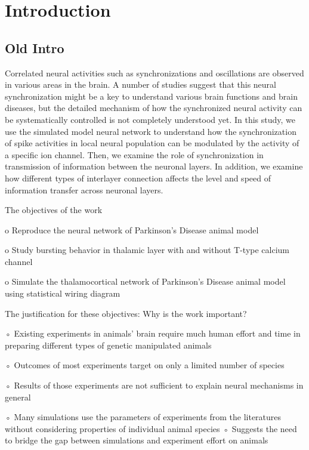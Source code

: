\chapter{Introduction}

\section{Old Intro}

Correlated neural activities such as synchronizations and oscillations are observed in various areas in the brain. A number of studies suggest that this neural synchronization might be a key to understand various brain functions and brain diseases, but the detailed mechanism of how the synchronized neural activity can be systematically controlled is not completely understood yet. 
In this study, we use the simulated model neural network to understand how the synchronization of spike activities in local neural population can be modulated by the activity of a specific ion channel. Then, we examine the role of synchronization in transmission of information between the neuronal layers. In addition, we examine how different types of interlayer connection affects the level and speed of information transfer across neuronal layers. 

The objectives of the work

o Reproduce the neural network of Parkinson’s Disease animal model

o Study bursting behavior in thalamic layer with and without T-type calcium channel

o Simulate the thalamocortical network of Parkinson’s Disease animal model using statistical wiring diagram


The justification for these objectives: Why is the work important?

◦ Existing experiments in animals’ brain require much human effort and time in preparing different types of genetic manipulated animals

◦ Outcomes of most experiments target on only a limited number of species

◦ Results of those experiments are not sufficient to explain neural mechanisms in general

◦ Many simulations use the parameters of experiments from the literatures without considering properties of individual animal species
◦ Suggests the need to bridge the gap between simulations and experiment effort on animals

